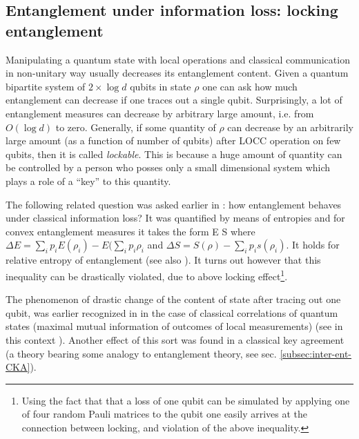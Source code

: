 \documentclass[twocolumn,aps,rmp]{revtex4}
\begin{document}
\subsection{Entanglement under information
loss: locking entanglement}
\label{subsec:locking}
Manipulating a quantum state with local operations and classical
communication in non-unitary way usually decreases its entanglement
content. Given a quantum bipartite system of $2\times\log d$ qubits in
state $\rho$ one can ask how much entanglement can decrease if one
traces out a single qubit. Surprisingly, a lot of entanglement
measures can decrease by arbitrary large amount, i.e. from
$O(\log d)$ to zero.
Generally, if some quantity of $\rho$ can decrease by an arbitrarily
large amount (as a function of number of qubits) after LOCC operation on
few qubits, then it is called {\it lockable}. This is because a huge
amount of quantity can be controlled by a person who posses only a
small dimensional system which plays a role of a ``key'' to this
quantity.


The following related question was asked earlier in \cite{Wilkens}:
how entanglement behaves under classical information loss?
It was quantified by means of entropies
and for convex entanglement measures it takes the form
\be
\Delta E \leq \Delta S
\label{eq:ent-info}
\ee
where $\Delta E= \sum_i p_i E(\rho_i)-E(\sum_ip_i\rho_i$ and
$\Delta S=S(\rho)-\sum_i p_is(\rho_i)$.
It holds for relative entropy of entanglement \cite{LPSW1999}
(see also \cite{Synak05-asym}). It turns out however that this inequality
can be drastically violated, due to above locking effect\footnote{Using
the fact that  that a loss of  one qubit can be simulated by
applying one of four random Pauli matrices
to the qubit one easily arrives at the connection between locking,
and violation of the above inequality.}.

The phenomenon of drastic change of the content of state  after tracing out one qubit, was earlier recognized in \cite{DiVincenzo-locking}  in the case of
classical correlations  of quantum states (maximal mutual information of
outcomes of local measurements) (see in this context
\cite{string-commitment,bh-locking,small-locking,3basis-locking}).
Another effect of this sort was found in a classical key agreement
\cite{renner-wolf-gap} (a theory bearing some analogy to
entanglement theory, see sec. \ref{subsec:inter-ent-CKA}).
\end{document}
